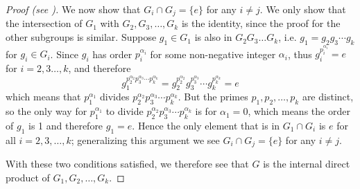 \begin{proof}[Proof (see {\cite[Lemma 13.8]{judson_beezer_2022}})]
    We now show that $G_i \cap G_j = \{e\}$ for any $i \neq j$. We only show that the intersection of $G_1$ with $G_2, G_3, \dots, G_k$ is the identity, since the proof for the other subgroups is similar. Suppose $g_1 \in G_1$ is also in $G_2G_3\dots G_k$, i.e. $g_1 = g_2g_3\cdots g_k$ for $g_i \in G_i$. Since $g_i$ has order $p_i^{\alpha_i}$ for some non-negative integer $\alpha_i$, thus $g_i^{p_i^{\alpha_i}} = e$ for $i = 2,3\dots,k$, and therefore
    \[
        g_1^{p_2^{\alpha_2}p_3^{\alpha_3}\cdots p_k^{\alpha_k}} = g_2^{p_2^{\alpha_2}}g_3^{p_3^{\alpha_3}}\cdots g_k^{p_k^{\alpha_k}} = e
    \]
    which means that $p_1^{\alpha_1}$ divides $p_2^{\alpha_2}p_3^{\alpha_3}\cdots p_k^{\alpha_k}$. But the primes $p_1, p_2, \dots, p_k$ are distinct, so the only way for $p_1^{\alpha_1}$ to divide $p_2^{\alpha_2}p_3^{\alpha_3}\cdots p_k^{\alpha_k}$ is for $\alpha_1 = 0$, which means the order of $g_1$ is 1 and therefore $g_1 = e$. Hence the only element that is in $G_1 \cap G_i$ is $e$ for all $i = 2, 3, \dots, k$; generalizing this argument we see $G_i \cap G_j = \{e\}$ for any $i \neq j$.

    With these two conditions satisfied, we therefore see that $G$ is the internal direct product of $G_1, G_2, \dots, G_k$.
\end{proof}

